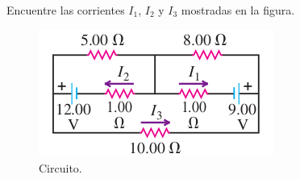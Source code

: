 \begin{mdframed}[style=warning]
	\begin{ejercicio}
		Encuentre las corrientes $I_1$, $I_2$ y $I_3$ mostradas en la figura.
		\begin{figure}[H]
			\centering
			\includegraphics[scale=0.5]{./img/circ.png}
			\caption{Circuito.}
			\label{circ}
		\end{figure}
	\end{ejercicio}
\end{mdframed}


















































